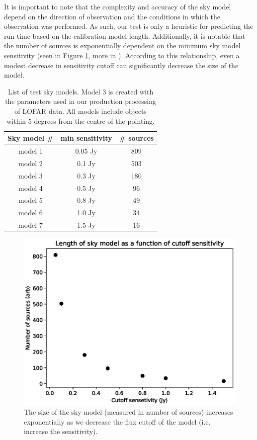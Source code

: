 It is important to note that the complexity and accuracy of the sky model depend on the direction of observation and the conditions in which the observation was performed. As such, our test is only a heuristic for predicting the run-time based on the calibration model length. Additionally, it is notable that the number of sources is exponentially dependent on the minimum sky model sensitivity (seen in Figure \ref{fig:skymodel_size}, more in \citealt{tgssadr,Wendy_bootes}). According to this relationship, even a modest decrease in sensitivity cutoff can significantly decrease the size of the model.

\begin{table}[!ht]
\centering
\begin{tabular}{||c| c | c||} 
 \hline
 Sky model \# & min sensitivity & \# sources  \\ [0.5ex] 
 \hline
 model 1 & 0.05 Jy & 809    \\ 
 model 2 & 0.1 Jy & 503   \\
 \rowcolor{Gray}
  \hline
 model 3 & 0.3 Jy & 180   \\
  \hline
 model 4 & 0.5 Jy & 96  \\
 model 5 & 0.8 Jy & 49   \\ 
 model 6 & 1.0 Jy & 34   \\
 model 7 & 1.5 Jy & 16   \\[1ex] 
 \hline
\end{tabular}
\caption{List of test sky models. Model 3 is created with the parameters used in our production processing of LOFAR data. All models include objects within 5 degrees from the centre of the pointing.  }
\label{table:skymodels}
\end{table}


\begin{figure}
    \includegraphics[width=0.95\linewidth]{figures/skymodel_size_vs_Jy.eps}
      \caption{The size of the sky model (measured in number of sources) increases exponentially as we decrease the flux cutoff of the model (i.e. increase the sensitivity).}
	\label{fig:skymodel_size}
\end{figure}


